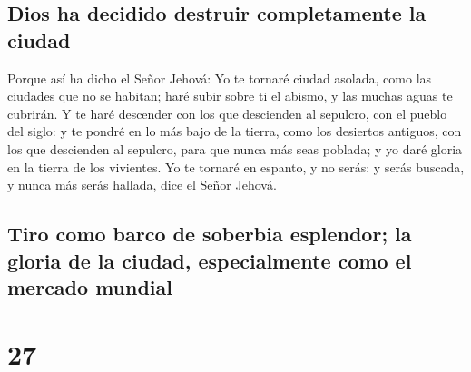 \hypertarget{dios-ha-decidido-destruir-completamente-la-ciudad}{%
\subsection{Dios ha decidido destruir completamente la
ciudad}\label{dios-ha-decidido-destruir-completamente-la-ciudad}}

 Porque así ha dicho el Señor Jehová: Yo te tornaré
ciudad asolada, como las ciudades que no se habitan; haré subir sobre ti
el abismo, y las muchas aguas te cubrirán.  Y te haré
descender con los que descienden al sepulcro, con el pueblo del siglo: y
te pondré en lo más bajo de la tierra, como los desiertos antiguos, con
los que descienden al sepulcro, para que nunca más seas poblada; y yo
daré gloria en la tierra de los vivientes.  Yo te tornaré
en espanto, y no serás: y serás buscada, y nunca más serás hallada, dice
el Señor Jehová.

\hypertarget{tiro-como-barco-de-soberbia-esplendor-la-gloria-de-la-ciudad-especialmente-como-el-mercado-mundial}{%
\subsection{Tiro como barco de soberbia esplendor; la gloria de la
ciudad, especialmente como el mercado
mundial}\label{tiro-como-barco-de-soberbia-esplendor-la-gloria-de-la-ciudad-especialmente-como-el-mercado-mundial}}

\hypertarget{section-26}{%
\section{27}\label{section-26}}

